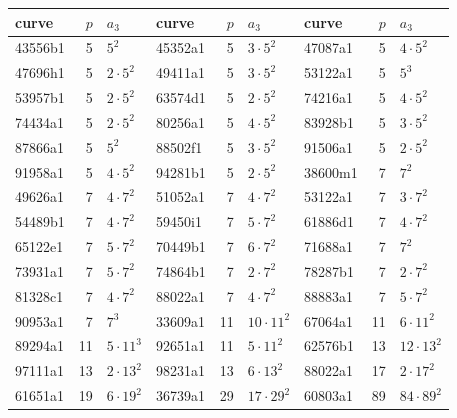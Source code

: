 \setlength{\tabcolsep}{4pt}
\begin{tabular}{lrl|lrl|lrl}
\hline
curve & $p$ & $a_3$ & curve & $p$ & $a_3$ & curve & $p$ & $a_3$\\ \hline
43556b1 & 5 & $5^{2}$ & 45352a1 & 5 & $3\cdot5^{2}$ & 47087a1 & 5 & $4\cdot5^{2}$\\
47696h1 & 5 & $2\cdot5^{2}$ & 49411a1 & 5 & $3\cdot5^{2}$ & 53122a1 & 5 & $5^{3}$\\
53957b1 & 5 & $2\cdot5^{2}$ & 63574d1 & 5 & $2\cdot5^{2}$ & 74216a1 & 5 & $4\cdot5^{2}$\\
74434a1 & 5 & $2\cdot5^{2}$ & 80256a1 & 5 & $4\cdot5^{2}$ & 83928b1 & 5 & $3\cdot5^{2}$\\
87866a1 & 5 & $5^{2}$ & 88502f1 & 5 & $3\cdot5^{2}$ & 91506a1 & 5 & $2\cdot5^{2}$\\
91958a1 & 5 & $4\cdot5^{2}$ & 94281b1 & 5 & $2\cdot5^{2}$ & 38600m1 & 7 & $7^{2}$\\
49626a1 & 7 & $4\cdot7^{2}$ & 51052a1 & 7 & $4\cdot7^{2}$ & 53122a1 & 7 & $3\cdot7^{2}$\\
54489b1 & 7 & $4\cdot7^{2}$ & 59450i1 & 7 & $5\cdot7^{2}$ & 61886d1 & 7 & $4\cdot7^{2}$\\
65122e1 & 7 & $5\cdot7^{2}$ & 70449b1 & 7 & $6\cdot7^{2}$ & 71688a1 & 7 & $7^{2}$\\
73931a1 & 7 & $5\cdot7^{2}$ & 74864b1 & 7 & $2\cdot7^{2}$ & 78287b1 & 7 & $2\cdot7^{2}$\\
81328c1 & 7 & $4\cdot7^{2}$ & 88022a1 & 7 & $4\cdot7^{2}$ & 88883a1 & 7 & $5\cdot7^{2}$\\
90953a1 & 7 & $7^{3}$ & 33609a1 & 11 & $10\cdot11^{2}$ & 67064a1 & 11 & $6\cdot11^{2}$\\
89294a1 & 11 & $5\cdot11^{3}$ & 92651a1 & 11 & $5\cdot11^{2}$ & 62576b1 & 13 & $12\cdot13^{2}$\\
97111a1 & 13 & $2\cdot13^{2}$ & 98231a1 & 13 & $6\cdot13^{2}$ & 88022a1 & 17 & $2\cdot17^{2}$\\
61651a1 & 19 & $6\cdot19^{2}$ & 36739a1 & 29 & $17\cdot29^{2}$ & 60803a1 & 89 & $84\cdot89^{2}$\\
\hline
\end{tabular}
